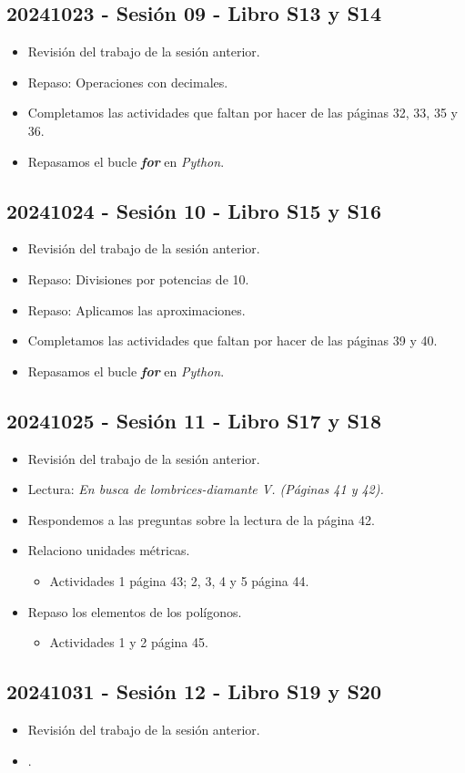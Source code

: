 \documentclass[a4paper,12pt]{article}
\begin{document}
\subsection{20241023 - Sesión 09 - Libro S13 y S14}

\begin{itemize}
    \item Revisión del trabajo de la sesión anterior.
    \item Repaso: Operaciones con decimales.
    \item Completamos las actividades que faltan por hacer de las páginas 32, 33, 35 y 36.
    \item Repasamos el bucle \textbf{\textit{for}} en \textit{Python}.
\end{itemize}

\subsection{20241024 - Sesión 10 - Libro S15 y S16}

\begin{itemize}
    \item Revisión del trabajo de la sesión anterior.
    \item Repaso: Divisiones por potencias de 10.
    \item Repaso: Aplicamos las aproximaciones.
    \item Completamos las actividades que faltan por hacer de las páginas 39 y 40.
    \item Repasamos el bucle \textbf{\textit{for}} en \textit{Python}.
\end{itemize}

\subsection{20241025 - Sesión 11 - Libro S17 y S18}

\begin{itemize}
    \item Revisión del trabajo de la sesión anterior.
    \item Lectura: \textit{En busca de lombrices-diamante V. (Páginas 41 y 42).}
    \item Respondemos a las preguntas sobre la lectura de la página 42.
    \item Relaciono unidades métricas.
    \begin{itemize}
        \item Actividades 1 página 43; 2, 3, 4 y 5 página 44.
    \end{itemize}
    \item Repaso los elementos de los polígonos.
    \begin{itemize}
        \item Actividades 1 y 2 página 45.
    \end{itemize}
\end{itemize}

\subsection{20241031 - Sesión 12 - Libro S19 y S20}

\begin{itemize}
    \item Revisión del trabajo de la sesión anterior.
    \item .
\end{itemize}
\end{document}
